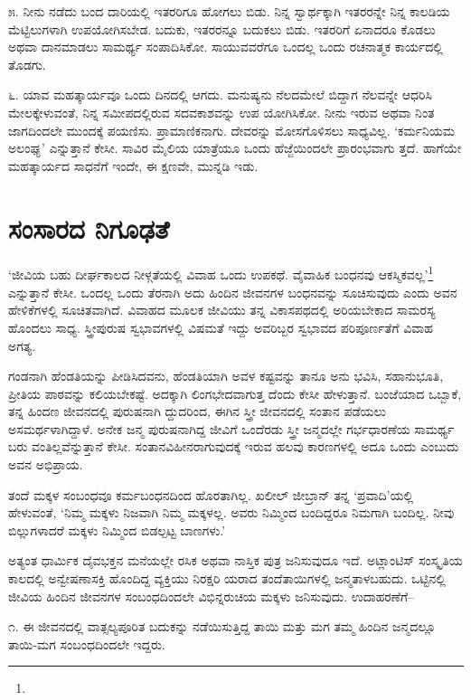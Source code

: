 ೫. ನೀನು ನಡೆದು ಬಂದ ದಾರಿಯಲ್ಲಿ ಇತರರಿಗೂ ಹೋಗಲು ಬಿಡು. ನಿನ್ನ ಸ್ವಾರ್ಥಕ್ಕಾಗಿ ಇತರರನ್ನೇ ನಿನ್ನ ಕಾಲಡಿಯ ಮೆಟ್ಟಿಲುಗಳಾಗಿ ಉಪಯೋಗಿಸಬೇಡ. ಬದುಕು, ಇತರರನ್ನೂ ಬದುಕಲು ಬಿಡು. ಇತರರಿಗೆ ಏನಾದರೂ ಕೊಡಲು ಅಥವಾ ದಾನಮಾಡಲು ಸಾಮರ್ಥ್ಯ ಸಂಪಾದಿಸಿಕೋ. ಸಾಯುವವರೆಗೂ ಒಂದಲ್ಲ ಒಂದು ರಚನಾತ್ಮಕ ಕಾರ್ಯದಲ್ಲಿ ತೊಡಗು.

೬. ಯಾವ ಮಹತ್ಕಾರ್ಯವೂ ಒಂದು ದಿನದಲ್ಲಿ ಆಗದು. ಮನುಷ್ಯನು ನೆಲದಮೇಲೆ ಬಿದ್ದಾಗ ನೆಲವನ್ನೇ ಆಧರಿಸಿ ಮೇಲಕ್ಕೇಳುವಂತೆ, ನಿನ್ನ ಸಮೀಪದಲ್ಲಿರುವ ಸದವಕಾಶವನ್ನು ಉಪ ಯೋಗಿಸಿಕೋ. ನೀನು ಇರುವ ಅಥವಾ ನಿಂತ ಜಾಗದಿಂದಲೇ ಮುಂದಕ್ಕೆ ಪಯಣಿಸು. ಪ್ರಾಮಾಣಿಕನಾಗು. ದೇವರನ್ನು ಮೋಸಗೊಳಿಸಲು ಸಾಧ್ಯವಿಲ್ಲ. ‘ಕರ್ಮನಿಯಮ ಅಲಂಘ್ಯ’ ಎನ್ನುತ್ತಾನೆ ಕೇಸೀ. ಸಾವಿರ ಮೈಲಿಯ ಯಾತ್ರೆಯೂ ಒಂದು ಹೆಜ್ಜೆಯಿಂದಲೇ ಪ್ರಾರಂಭವಾಗು ತ್ತದೆ. ಹಾಗೆಯೇ ಮಹತ್ಕಾರ್ಯದ ಸಾಧನೆಗೆ ಇಂದೇ, ಈ ಕ್ಷಣವೇ, ಮುನ್ನಡಿ ಇಡು.


\section{ಸಂಸಾರದ ನಿಗೂಢತೆ}

‘ಜೀವಿಯ ಬಹು ದೀರ್ಘಕಾಲದ ನೀಳ್ಗತೆಯಲ್ಲಿ ವಿವಾಹ ಒಂದು ಉಪಕಥೆ. ವೈವಾಹಿಕ ಬಂಧನವು ಆಕಸ್ಮಿಕವಲ್ಲ’\footnote{} ಎನ್ನುತ್ತಾನೆ ಕೇಸೀ. ಒಂದಲ್ಲ ಒಂದು ತೆರನಾಗಿ ಅದು ಹಿಂದಿನ ಜೀವನಗಳ ಬಂಧನವನ್ನು ಸೂಚಿಸುವುದು ಎಂದು ಅವನ ಹೇಳಿಕೆಗಳಲ್ಲಿ ಸೂಚಿತವಾಗಿದೆ. ವಿವಾಹದ ಮೂಲಕ ಜೀವಿಯು ತನ್ನ ವಿಕಾಸಪಥದಲ್ಲಿ ಅರಿಯಬೇಕಾದ ಸಾಮರಸ್ಯ ಹೊಂದಲು ಸಾಧ್ಯ. ಸ್ತ್ರೀಪುರುಷ ಸ್ವಭಾವಗಳಲ್ಲಿ ವಿಷಮತೆ ಇದ್ದು ಅವರಿಬ್ಬರ ಸ್ವಭಾವದ ಪರಿಪೂರ್ಣತೆಗೆ ವಿವಾಹ ಅಗತ್ಯ.

ಗಂಡನಾಗಿ ಹೆಂಡತಿಯನ್ನು ಪೀಡಿಸಿದವನು, ಹೆಂಡತಿಯಾಗಿ ಅವಳ ಕಷ್ಟವನ್ನು ತಾನೂ ಅನು ಭವಿಸಿ, ಸಹಾನುಭೂತಿ, ಪ್ರೀತಿಯ ಪಾಠವನ್ನು ಕಲಿಯಬೇಕಷ್ಟೆ. ಅದಕ್ಕಾಗಿ ಲಿಂಗಭೇದವಾಗುತ್ತ ದೆಂದು ಕೇಸೀ ಹೇಳುತ್ತಾನೆ. ಬಂಜೆಯಾದ ಒಬ್ಬಾಕೆ, ತನ್ನ ಹಿಂದಣ ಜೀವನದಲ್ಲಿ ಪುರುಷನಾಗಿ ದ್ದುದರಿಂದ, ಈಗಿನ ಸ್ತ್ರೀ ಜೀವನದಲ್ಲಿ ಸಂತಾನ ಪಡೆಯಲು ಅಸಮರ್ಥಳಾಗಿದ್ದಾಳೆ. ಅನೇಕ ಜನ್ಮ ಪುರುಷನಾಗಿದ್ದ ಜೀವಿಗೆ ಒಂದೆರಡು ಸ್ತ್ರೀ ಜನ್ಮದಲ್ಲೇ ಗರ್ಭಧಾರಣೆಯ ಸಾಮರ್ಥ್ಯ ಬರು ವಂತಿಲ್ಲವೆನ್ನುತ್ತಾನೆ ಕೇಸೀ. ಸಂತಾನವಿಹೀನರಾಗುವುದಕ್ಕೆ ಇರುವ ಹಲವು ಕಾರಣಗಳಲ್ಲಿ ಅದೂ ಒಂದು ಎಂಬುದು ಅವನ ಅಭಿಪ್ರಾಯ.

ತಂದೆ ಮಕ್ಕಳ ಸಂಬಂಧವೂ ಕರ್ಮಬಂಧನದಿಂದ ಹೊರತಾಗಿಲ್ಲ. ಖಲೀಲ್ ಜೀಬ್ರಾನ್ ತನ್ನ ‘ಪ್ರವಾದಿ’ಯಲ್ಲಿ ಹೇಳುವಂತೆ, ‘ನಿಮ್ಮ ಮಕ್ಕಳು ನಿಜವಾಗಿ ನಿಮ್ಮ ಮಕ್ಕಳಲ್ಲ. ಅವರು ನಿಮ್ಮಿಂದ ಬಂದಿದ್ದರೂ ನಿಮಗಾಗಿ ಬಂದಿಲ್ಲ. ನೀವು ಬಿಲ್ಲುಗಳಾದರೆ ಮಕ್ಕಳು ನಿಮ್ಮಿಂದ ಬಿಡಲ್ಪಟ್ಟ ಬಾಣಗಳು.’

ಅತ್ಯಂತ ಧಾರ್ಮಿಕ ದೈವಭಕ್ತನ ಮನೆಯಲ್ಲೇ ರಸಿಕ ಅಥವಾ ನಾಸ್ತಿಕ ಪುತ್ರ ಜನಿಸುವುದೂ ಇದೆ. ಅಟ್ಲಾಂಟಿಸ್ ಸಂಸ್ಕೃತಿಯ ಕಾಲದಲ್ಲಿ ಅನ್ವೇಷಣಾಸಕ್ತಿ ಹೊಂದಿದ್ದ ವ್ಯಕ್ತಿಯು ನಿರಕ್ಷರಿ ಯರಾದ ತಂದೆತಾಯಿಗಳಲ್ಲಿ ಜನ್ಮತಾಳಬಹುದು. ಒಟ್ಟಿನಲ್ಲಿ ಜೀವಿಯ ಹಿಂದಿನ ಜೀವನಗಳ ಸಂಬಂಧದಿಂದಲೇ ವಿಭಿನ್ನರುಚಿಯ ಮಕ್ಕಳು ಜನಿಸುವುದು. ಉದಾಹರಣೆಗೆ–

೧. ಈ ಜೀವನದಲ್ಲಿ ವಾತ್ಸಲ್ಯಪೂರಿತ ಬದುಕನ್ನು ನಡೆಯಿಸುತ್ತಿದ್ದ ತಾಯಿ ಮತ್ತು ಮಗ ತಮ್ಮ ಹಿಂದಿನ ಜನ್ಮದಲ್ಲೂ ತಾಯಿ-ಮಗ ಸಂಬಂಧದಿಂದಲೇ ಇದ್ದರು.

